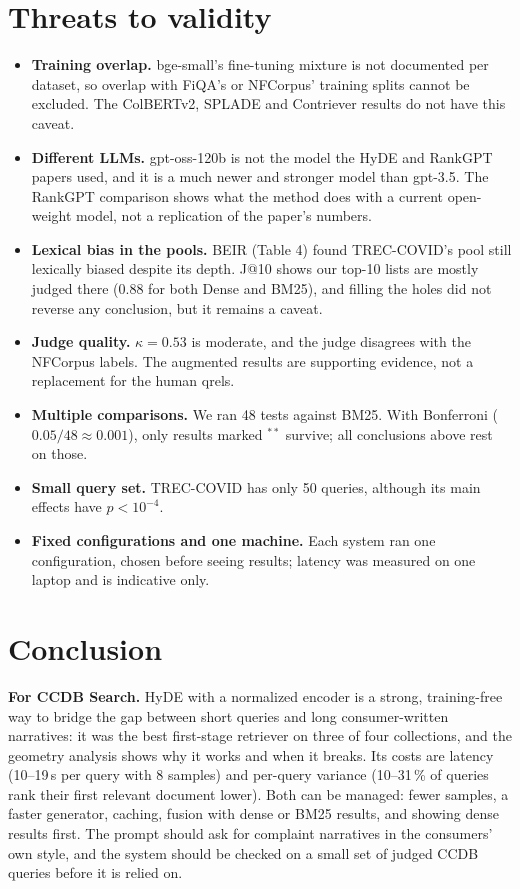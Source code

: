 \documentclass[11pt]{article}
\begin{document}
\section{Threats to validity}\label{sec:threats}
\begin{itemize}
\item \textbf{Training overlap.} bge-small's fine-tuning mixture is not documented per dataset, so
  overlap with FiQA's or NFCorpus' training splits cannot be excluded. The ColBERTv2, SPLADE and
  Contriever results do not have this caveat.
\item \textbf{Different LLMs.} gpt-oss-120b is not the model the HyDE and RankGPT papers used, and it
  is a much newer and stronger model than gpt-3.5. The RankGPT comparison shows what the method does
  with a current open-weight model, not a replication of the paper's numbers.
\item \textbf{Lexical bias in the pools.} BEIR (Table 4) found TREC-COVID's pool still lexically
  biased despite its depth. J@10 shows our top-10 lists are mostly judged there (0.88 for both Dense
  and BM25), and filling the holes did not reverse any conclusion, but it remains a caveat.
\item \textbf{Judge quality.} $\kappa=0.53$ is moderate, and the judge disagrees with the NFCorpus
  labels. The augmented results are supporting evidence, not a replacement for the human qrels.
\item \textbf{Multiple comparisons.} We ran 48 tests against BM25. With Bonferroni ($0.05/48\approx0.001$),
  only results marked $^{**}$ survive; all conclusions above rest on those.
\item \textbf{Small query set.} TREC-COVID has only 50 queries, although its main effects have
  $p<10^{-4}$.
\item \textbf{Fixed configurations and one machine.} Each system ran one configuration, chosen before
  seeing results; latency was measured on one laptop and is indicative only.
\end{itemize}

\section{Conclusion}\label{sec:concl}
\textbf{For CCDB Search.} HyDE with a normalized encoder is a strong, training-free way to bridge the
gap between short queries and long consumer-written narratives: it was the best first-stage
retriever on three of four collections, and the geometry analysis shows why it works and when it
breaks. Its costs are latency (10--19\,s per query with 8 samples) and per-query variance (10--31\,\%
of queries rank their first relevant document lower). Both can be managed: fewer samples, a faster
generator, caching, fusion with dense or BM25 results, and showing dense results first. The prompt
should ask for complaint narratives in the consumers' own style, and the system should be checked on
a small set of judged CCDB queries before it is relied on.
\end{document}
